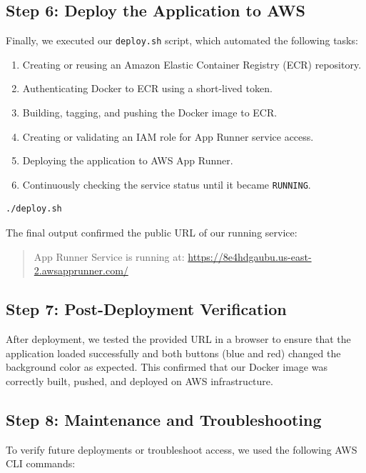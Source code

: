 \subsection{Step 6: Deploy the Application to AWS}

Finally, we executed our \texttt{deploy.sh} script, which automated the following tasks:

\begin{enumerate}
    \item Creating or reusing an Amazon Elastic Container Registry (ECR) repository.
    \item Authenticating Docker to ECR using a short-lived token.
    \item Building, tagging, and pushing the Docker image to ECR.
    \item Creating or validating an IAM role for App Runner service access.
    \item Deploying the application to AWS App Runner.
    \item Continuously checking the service status until it became \texttt{RUNNING}.
\end{enumerate}

\begin{verbatim}
./deploy.sh
\end{verbatim}

The final output confirmed the public URL of our running service:

\begin{quote}
App Runner Service is running at: \url{https://8e4hdgaubu.us-east-2.awsapprunner.com/}
\end{quote}

\subsection{Step 7: Post-Deployment Verification}

After deployment, we tested the provided URL in a browser to ensure that the application loaded successfully and both buttons (blue and red) changed the background color as expected. This confirmed that our Docker image was correctly built, pushed, and deployed on AWS infrastructure.

\subsection{Step 8: Maintenance and Troubleshooting}

To verify future deployments or troubleshoot access, we used the following AWS CLI commands:

